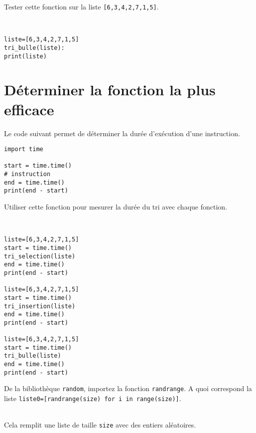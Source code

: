 \begin{exercice}
Tester cette fonction sur la liste \verb?[6,3,4,2,7,1,5]?.
\end{exercice}

\begin{solution}~\\
\vspace{-0.7cm}
\begin{verbatim}
liste=[6,3,4,2,7,1,5]
tri_bulle(liste): 
print(liste)
\end{verbatim}    
\end{solution}

\section{Déterminer la fonction la plus efficace}

Le code suivant permet de déterminer la durée d'exécution d'une instruction.

\begin{verbatim}
import time

start = time.time()
# instruction
end = time.time()
print(end - start)
\end{verbatim} 

\begin{exercice}
Utiliser cette fonction pour mesurer la durée du tri avec chaque fonction.
\end{exercice}

\begin{solution}~\\
\vspace{-0.7cm}
\begin{verbatim}
liste=[6,3,4,2,7,1,5]
start = time.time()
tri_selection(liste)
end = time.time()
print(end - start)

liste=[6,3,4,2,7,1,5]
start = time.time()
tri_insertion(liste)
end = time.time()
print(end - start)

liste=[6,3,4,2,7,1,5]
start = time.time()
tri_bulle(liste)
end = time.time()
print(end - start)
\end{verbatim}    
\end{solution}

\begin{exercice}
De la bibliothèque \verb?random?, importez la fonction \verb?randrange?. A quoi correspond la liste \verb?liste0=[randrange(size) for i in range(size)]?.
\end{exercice}

\begin{solution}~\\
\vspace{-0.7cm}
Cela remplit une liste de taille \verb?size? avec des entiers aléatoires.
\newpage
\end{solution}

